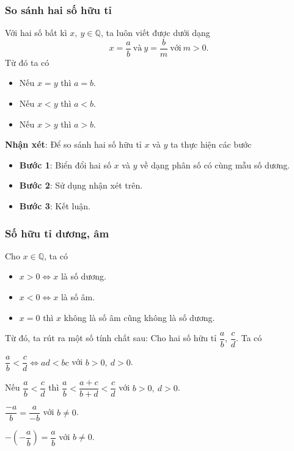 \subsubsection{So sánh hai số hữu tỉ}
Với hai số bất kì $x,\ y\in\mathbb{Q}$, ta luôn viết được dưới dạng 
$$x=\dfrac{a}{b}\ \text{và}\ y=\dfrac{b}{m}\ \text{với}\ m>0.$$
Từ đó ta có
\begin{itemize}
	\item Nếu $x=y$ thì $a=b$.
	\item Nếu $x<y$ thì $a<b$.
	\item Nếu $x>y$ thì $a>b$.
\end{itemize}
\textbf{Nhận xét}: Để so sánh hai số hữu tỉ $x$ và $y$ ta thực hiện các bước 
	\begin{itemize}
		\item \textbf{Bước 1}: Biển đổi hai số $x$ và $y$ về dạng phân số có cùng mẫu số dương.
		\item \textbf{Bước 2}: Sử dụng nhận xét trên.
		\item \textbf{Bước 3}: Kết luận.
	\end{itemize}

\subsubsection{Số hữu tỉ dương, âm}
Cho $x\in\mathbb{Q}$, ta có
\begin{itemize}
	\item $x>0\Leftrightarrow x$ là số dương.
	\item $x<0\Leftrightarrow x$ là số âm.
	\item $x=0$ thì $x$ không là số âm cũng không là số dương.
\end{itemize}
Từ đó, ta rút ra một số tính chất sau: Cho hai số hữu tỉ $\dfrac{a}{b}$, $\dfrac{c}{d}$. Ta có
\begin{tc}
	$\dfrac{a}{b}<\dfrac{c}{d}\Leftrightarrow ad<bc$ với $b>0,\ d>0$.
\end{tc}

\begin{tc}
	Nếu $\dfrac{a}{b}<\dfrac{c}{d}$ thì $\dfrac{a}{b}<\dfrac{a+c}{b+d}<\dfrac{c}{d}$ với $b>0,\ d>0$.
\end{tc}

\begin{tc}
	$\dfrac{-a}{b}=\dfrac{a}{-b}$ với $b\neq 0$.
\end{tc}

\begin{tc}
	$-\left(-\dfrac{a}{b}\right)=\dfrac{a}{b}$ với $b\neq 0$.
\end{tc}

